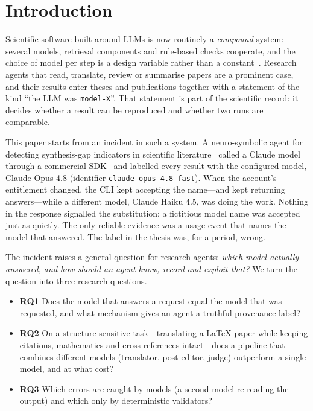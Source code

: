 \section{Introduction}
\label{sec:intro}

Scientific software built around LLMs is now routinely a \emph{compound} system: several models, retrieval components and rule-based checks cooperate, and the choice of model per step is a design variable rather than a constant~\cite{chen2024compound,chen2023frugalgpt,ong2024routellm}. Research agents that read, translate, review or summarise papers are a prominent case, and their results enter theses and publications together with a statement of the kind ``the LLM was \texttt{model-X}''. That statement is part of the scientific record: it decides whether a result can be reproduced and whether two runs are comparable.

This paper starts from an incident in such a system. A neuro-symbolic agent for detecting synthesis-gap indicators in scientific literature~\cite{arya2026wizard} called a Claude model through a commercial SDK~\cite{copilotsdk2026} and labelled every result with the configured model, Claude Opus 4.8 (identifier \texttt{claude-opus-4.8-fast}). When the account's entitlement changed, the CLI kept accepting the name---and kept returning answers---while a different model, Claude Haiku 4.5, was doing the work. Nothing in the response signalled the substitution; a fictitious model name was accepted just as quietly. The only reliable evidence was a usage event that names the model that answered. The label in the thesis was, for a period, wrong.

The incident raises a general question for research agents: \emph{which model actually answered, and how should an agent know, record and exploit that?} We turn the question into three research questions.
\begin{itemize}
  \item \textbf{RQ1} Does the model that answers a request equal the model that was requested, and what mechanism gives an agent a truthful provenance label?
  \item \textbf{RQ2} On a structure-sensitive task---translating a LaTeX paper while keeping citations, mathematics and cross-references intact---does a pipeline that combines different models (translator, post-editor, judge) outperform a single model, and at what cost?
  \item \textbf{RQ3} Which errors are caught by models (a second model re-reading the output) and which only by deterministic validators?
\end{itemize}


